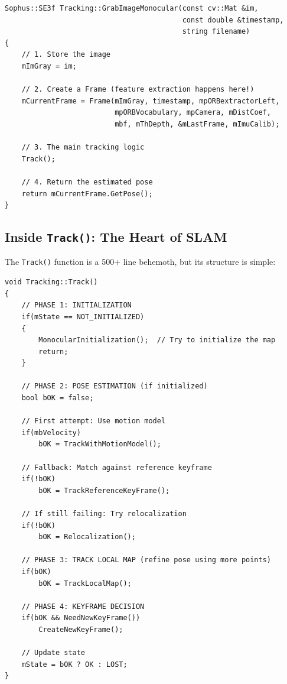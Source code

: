 \begin{lstlisting}[caption={GrabImageMonocular simplified}]
Sophus::SE3f Tracking::GrabImageMonocular(const cv::Mat &im, 
                                          const double &timestamp, 
                                          string filename)
{
    // 1. Store the image
    mImGray = im;
    
    // 2. Create a Frame (feature extraction happens here!)
    mCurrentFrame = Frame(mImGray, timestamp, mpORBextractorLeft, 
                          mpORBVocabulary, mpCamera, mDistCoef, 
                          mbf, mThDepth, &mLastFrame, mImuCalib);
    
    // 3. The main tracking logic
    Track();
    
    // 4. Return the estimated pose
    return mCurrentFrame.GetPose();
}
\end{lstlisting}

\subsection{Inside \texttt{Track()}: The Heart of SLAM}

The \texttt{Track()} function is a 500+ line behemoth, but its structure is simple:

\begin{lstlisting}[caption={Track() simplified structure}]
void Tracking::Track()
{
    // PHASE 1: INITIALIZATION
    if(mState == NOT_INITIALIZED)
    {
        MonocularInitialization();  // Try to initialize the map
        return;
    }
    
    // PHASE 2: POSE ESTIMATION (if initialized)
    bool bOK = false;
    
    // First attempt: Use motion model
    if(mbVelocity)
        bOK = TrackWithMotionModel();
    
    // Fallback: Match against reference keyframe
    if(!bOK)
        bOK = TrackReferenceKeyFrame();
    
    // If still failing: Try relocalization
    if(!bOK)
        bOK = Relocalization();
    
    // PHASE 3: TRACK LOCAL MAP (refine pose using more points)
    if(bOK)
        bOK = TrackLocalMap();
    
    // PHASE 4: KEYFRAME DECISION
    if(bOK && NeedNewKeyFrame())
        CreateNewKeyFrame();
    
    // Update state
    mState = bOK ? OK : LOST;
}
\end{lstlisting}

